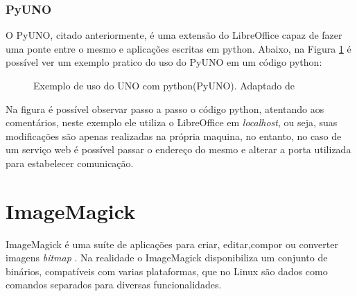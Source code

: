 \subsubsection{PyUNO}

O PyUNO, citado anteriormente, é uma extensão do LibreOffice capaz de fazer uma ponte entre o mesmo e aplicações escritas em python. Abaixo, na Figura \ref{exemple_uno} é possível ver um exemplo pratico do uso do PyUNO em um código python:

\begin{figure}[ht]
    \centering
    \caption{Exemplo de uso do UNO com python(PyUNO). Adaptado de \cite{MINETTO-PYUNO}}
    \label{exemple_uno}
\end{figure}

Na figura é possível observar passo a passo o código python, atentando aos comentários, neste exemplo ele utiliza o LibreOffice em \textit{localhost}, ou seja, suas modificações são apenas realizadas na própria maquina, no entanto, no caso de um serviço web é possível passar o endereço do mesmo e alterar a porta utilizada para estabelecer comunicação.

\section{ImageMagick}

ImageMagick é uma suíte de aplicações para criar, editar,compor ou converter imagens \textit{bitmap} \cite{IMAGEMAGICK-STUDIO}.
Na realidade o ImageMagick disponibiliza um conjunto de binários, compatíveis com varias plataformas, que no Linux são dados como comandos separados para diversas funcionalidades.

